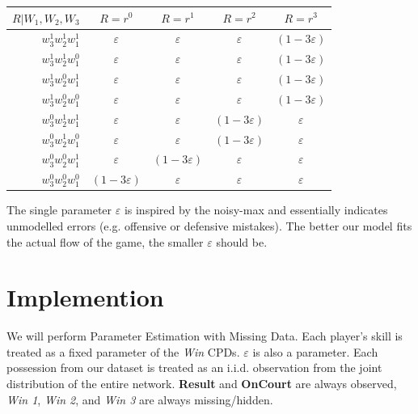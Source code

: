 \documentclass[10pt,twocolumn]{article}
\begin{document}
\begin{tabular}{ r|c c c c|}
$R|W_1,W_2,W_3$ & $R=r^0$ & $R=r^1$ & $R=r^2$ & $R=r^3$ \\  \hline
$w^1_3 w^1_2 w^1_1$ & $\varepsilon$ &  $\varepsilon$ &  $\varepsilon$ & $(1 - 3 \varepsilon)$ \\ \hline
$w^1_3 w^1_2 w^0_1$ & $\varepsilon$ &  $\varepsilon$ &  $\varepsilon$ & $(1 - 3 \varepsilon)$ \\ \hline
$w^1_3 w^0_2 w^1_1$ & $\varepsilon$ &  $\varepsilon$ &  $\varepsilon$ & $(1 - 3 \varepsilon)$ \\ \hline
$w^1_3 w^0_2 w^0_1$ & $\varepsilon$ &  $\varepsilon$ &  $\varepsilon$ & $(1 - 3 \varepsilon)$ \\ \hline
$w^0_3 w^1_2 w^1_1$ & $\varepsilon$ &  $\varepsilon$ &  $(1 - 3 \varepsilon)$ & $\varepsilon$ \\ \hline
$w^0_3 w^1_2 w^0_1$ & $\varepsilon$ &  $\varepsilon$ &  $(1 - 3 \varepsilon)$ & $\varepsilon$ \\ \hline
$w^0_3 w^0_2 w^1_1$ & $\varepsilon$ & $(1 - 3 \varepsilon)$   & $\varepsilon$ & $\varepsilon$ \\ \hline
$w^0_3 w^0_2 w^0_1$ & $(1 - 3 \varepsilon)$ & $\varepsilon$   & $\varepsilon$ & $\varepsilon$ \\ \hline
\end{tabular}


The single parameter $\varepsilon$ is inspired by the noisy-max and essentially indicates unmodelled errors (e.g. offensive or defensive mistakes).
The better our model fits the actual flow of the game, the smaller $\varepsilon$ should be.



\section{Implemention}

We will perform Parameter Estimation with Missing Data.
Each player's skill is treated as a fixed parameter of the \emph{Win} CPDs.
$\varepsilon$ is also a parameter.
Each possession from our dataset is treated as an i.i.d. observation from the joint distribution of the entire network.
{\bf Result} and {\bf OnCourt} are always observed, \emph{Win 1}, \emph{Win 2}, and \emph{Win 3} are always missing/hidden.
\end{document}
